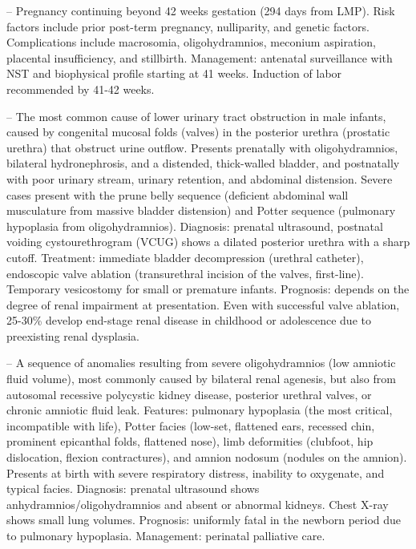 -- Pregnancy continuing beyond 42 weeks gestation (294 days from LMP). Risk factors include prior post-term pregnancy, nulliparity, and genetic factors. Complications include macrosomia, oligohydramnios, meconium aspiration, placental insufficiency, and stillbirth. Management: antenatal surveillance with NST and biophysical profile starting at 41 weeks. Induction of labor recommended by 41-42 weeks.

-- The most common cause of lower urinary tract obstruction in male infants, caused by congenital mucosal folds (valves) in the posterior urethra (prostatic urethra) that obstruct urine outflow. Presents prenatally with oligohydramnios, bilateral hydronephrosis, and a distended, thick-walled bladder, and postnatally with poor urinary stream, urinary retention, and abdominal distension. Severe cases present with the prune belly sequence (deficient abdominal wall musculature from massive bladder distension) and Potter sequence (pulmonary hypoplasia from oligohydramnios). Diagnosis: prenatal ultrasound, postnatal voiding cystourethrogram (VCUG) shows a dilated posterior urethra with a sharp cutoff. Treatment: immediate bladder decompression (urethral catheter), endoscopic valve ablation (transurethral incision of the valves, first-line). Temporary vesicostomy for small or premature infants. Prognosis: depends on the degree of renal impairment at presentation. Even with successful valve ablation, 25-30\% develop end-stage renal disease in childhood or adolescence due to preexisting renal dysplasia.

-- A sequence of anomalies resulting from severe oligohydramnios (low amniotic fluid volume), most commonly caused by bilateral renal agenesis, but also from autosomal recessive polycystic kidney disease, posterior urethral valves, or chronic amniotic fluid leak. Features: pulmonary hypoplasia (the most critical, incompatible with life), Potter facies (low-set, flattened ears, recessed chin, prominent epicanthal folds, flattened nose), limb deformities (clubfoot, hip dislocation, flexion contractures), and amnion nodosum (nodules on the amnion). Presents at birth with severe respiratory distress, inability to oxygenate, and typical facies. Diagnosis: prenatal ultrasound shows anhydramnios/oligohydramnios and absent or abnormal kidneys. Chest X-ray shows small lung volumes. Prognosis: uniformly fatal in the newborn period due to pulmonary hypoplasia. Management: perinatal palliative care.

